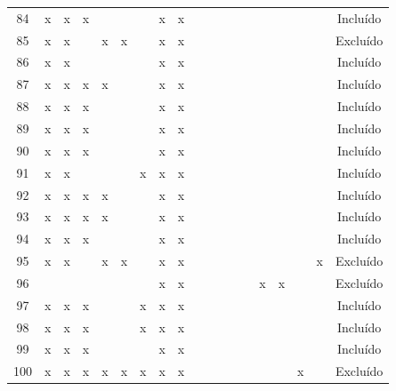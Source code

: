 \documentclass[
	12pt,				%
	oneside,			%
	a4paper,			%
	english,			%
	brazil				%
	]{abntex2ppgsi}
\begin{document}
\begin{apendicesenv}
\begin{table}[H]
\begin{tabular}{c | c c c c c c c c | c c c c c c c c c | c}
84 & x & x & x &   &   &   & x & x &   &   &   &   &   &   &   &   &   & Incluído \\
85 & x & x &   & x & x &   & x & x &   &   &   &   &   &   &   &   &   & Excluído \\
86 & x & x &   &   &   &   & x & x &   &   &   &   &   &   &   &   &   & Incluído \\
87 & x & x & x & x &   &   & x & x &   &   &   &   &   &   &   &   &   & Incluído \\
88 & x & x & x &   &   &   & x & x &   &   &   &   &   &   &   &   &   & Incluído \\
89 & x & x & x &   &   &   & x & x &   &   &   &   &   &   &   &   &   & Incluído \\
90 & x & x & x &   &   &   & x & x &   &   &   &   &   &   &   &   &   & Incluído \\
91 & x & x &   &   &   & x & x & x &   &   &   &   &   &   &   &   &   & Incluído \\
92 & x & x & x & x &   &   & x & x &   &   &   &   &   &   &   &   &   & Incluído \\
93 & x & x & x & x &   &   & x & x &   &   &   &   &   &   &   &   &   & Incluído \\
94 & x & x & x &   &   &   & x & x &   &   &   &   &   &   &   &   &   & Incluído \\
95 & x & x &   & x & x &   & x & x &   &   &   &   &   &   &   &   & x & Excluído \\
96 &   &   &   &   &   &   & x & x &   &   &   &   &   & x & x &   &   & Excluído \\
97 & x & x & x &   &   & x & x & x &   &   &   &   &   &   &   &   &   & Incluído \\
98 & x & x & x &   &   & x & x & x &   &   &   &   &   &   &   &   &   & Incluído \\
99 & x & x & x &   &   &   & x & x &   &   &   &   &   &   &   &   &   & Incluído \\
100 & x & x & x & x & x & x & x & x &   &   &   &   &   &   &   & x &   & Excluído \\
\bottomrule
\end{tabular}
\end{table}


\end{apendicesenv}
\end{document}
